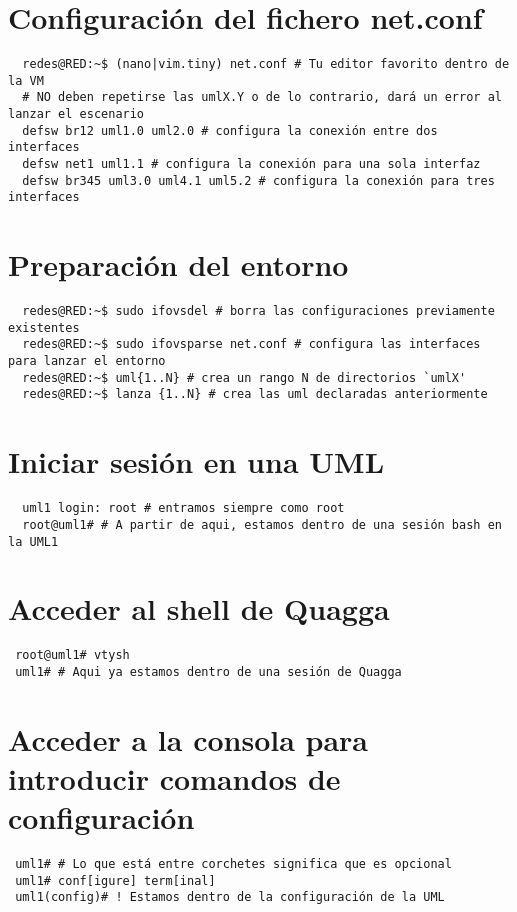 \documentclass{article}
\begin{document}
\tableofcontents

\section{Configuración del fichero net.conf}
\begin{verbatim}
  redes@RED:~$ (nano|vim.tiny) net.conf # Tu editor favorito dentro de la VM
  # NO deben repetirse las umlX.Y o de lo contrario, dará un error al lanzar el escenario
  defsw br12 uml1.0 uml2.0 # configura la conexión entre dos interfaces
  defsw net1 uml1.1 # configura la conexión para una sola interfaz
  defsw br345 uml3.0 uml4.1 uml5.2 # configura la conexión para tres interfaces
\end{verbatim}

\section{Preparación del entorno}
\begin{verbatim}
  redes@RED:~$ sudo ifovsdel # borra las configuraciones previamente existentes
  redes@RED:~$ sudo ifovsparse net.conf # configura las interfaces para lanzar el entorno
  redes@RED:~$ uml{1..N} # crea un rango N de directorios `umlX'
  redes@RED:~$ lanza {1..N} # crea las uml declaradas anteriormente
\end{verbatim}

\section{Iniciar sesión en una UML}
\begin{verbatim}
  uml1 login: root # entramos siempre como root
  root@uml1# # A partir de aqui, estamos dentro de una sesión bash en la UML1
\end{verbatim}

\section{Acceder al shell de Quagga}
\begin{verbatim}
 root@uml1# vtysh
 uml1# # Aqui ya estamos dentro de una sesión de Quagga
\end{verbatim}

\section{Acceder a la consola para introducir comandos de configuración}
\begin{verbatim}
 uml1# # Lo que está entre corchetes significa que es opcional
 uml1# conf[igure] term[inal]
 uml1(config)# ! Estamos dentro de la configuración de la UML
\end{verbatim}
\end{document}
